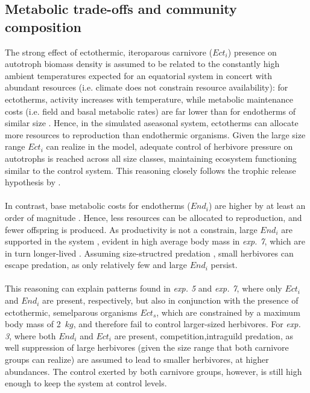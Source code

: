 \subsection{Metabolic trade-offs and community composition}
The strong effect of ectothermic, iteroparous carnivore ($Ect_i$) presence on autotroph biomass density is assumed to be related to the constantly high ambient temperatures expected for an equatorial system in concert with abundant resources (i.e. climate does not constrain resource availability): for ectotherms, activity increases with temperature, while metabolic maintenance costs (i.e. field and basal metabolic rates) are  far lower than for endotherms of similar size \citep{Nagy2005,Buckley2012}. 
Hence, in the simulated aseasonal system, ectotherms can allocate more resources to reproduction than endothermic organisms. 
Given the large size range $Ect_i$ can realize in the model,  adequate control of herbivore pressure on autotrophs is reached across all size classes, maintaining ecosystem functioning similar to the control system. 
This reasoning closely follows the trophic release hypothesis by \cite{Hairston1960}. 
\\\\
In contrast, base metabolic costs for endotherms ($End_i$) are higher by at least an order of magnitude \citep{Nagy2005}. 
Hence, less resources can be allocated to reproduction, and fewer offspring is produced. 
As productivity is not a constrain, large $End_i$ are supported in the system \citep{Smith2011}, evident in high average body mass in \textit{exp. 7}, which are in turn longer-lived \citep{Speakman2005}. 
Assuming size-structred predation \citep{Williams2010}, small herbivores can escape predation, as only relatively few and large $End_i$ persist. \\\\
This reasoning can explain patterns found in \textit{exp. 5} and \textit{exp. 7}, where only $Ect_i$ and $End_i$ are present, respectively, but also in conjunction with the presence of ectothermic, semelparous organisms  $Ect_s$, which are constrained by a maximum body mass of 2~$kg$, and therefore fail to control larger-sized herbivores. For \textit{exp. 3}, where both $End_i$ and $Ect_i$ are present, competition,intraguild predation, as well suppression of large herbivores (given the size range that both carnivore groups can realize) are assumed to lead to smaller herbivores, at higher abundances. The control exerted by both carnivore groups, however, is still high enough to keep the system at control levels.
%

